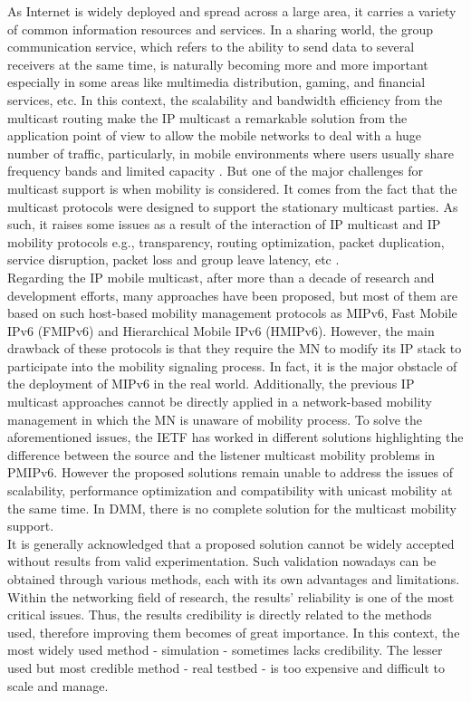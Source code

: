 As Internet is widely deployed and spread across a large area, it carries a variety of common information resources and services. In a sharing world, the group communication service, which refers to the ability to send data to several receivers at the same time, is naturally becoming more and more important especially in some areas like multimedia distribution, gaming, and financial services, etc. In this context, the scalability and bandwidth efficiency from the multicast routing make the IP multicast a remarkable solution from the application point of view to allow the mobile networks to deal with a huge number of traffic, particularly, in mobile environments where users usually share frequency bands and limited capacity \cite{Multicast_MIPv6}. But one of the major challenges for multicast support is when mobility is considered. It comes from the fact that the multicast protocols were designed to support the stationary multicast parties. As such, it raises some issues as a result of the interaction of IP multicast and IP mobility protocols e.g., transparency, routing optimization, packet duplication, service disruption, packet loss and group leave latency, etc \cite{Multicast_MIPv6, multicast_challenges_solutions}.\\
 
Regarding the IP mobile multicast, after more than a decade of research and development efforts, many approaches have been proposed, but most of them are based on such host-based mobility management protocols as MIPv6, Fast Mobile IPv6 (FMIPv6) and Hierarchical Mobile IPv6 (HMIPv6). However, the main drawback of these protocols is that they require the MN to modify its IP stack to participate into the mobility signaling process. In fact, it is the major obstacle of the deployment of MIPv6 in the real world. Additionally, the previous IP multicast approaches cannot be directly applied in a network-based mobility management in which the MN is unaware of mobility process. To solve the aforementioned issues, the IETF has worked in different solutions highlighting the difference between the source and the listener multicast mobility problems in PMIPv6. However the proposed solutions remain unable to address the issues of scalability, performance optimization and compatibility with unicast mobility at the same time. In DMM, there is no complete solution for the multicast mobility support.\\

It is generally acknowledged that a proposed solution cannot be widely accepted without results from valid experimentation. Such validation nowadays can be obtained through various methods, each with its own advantages and limitations. Within the networking field of research, the results’ reliability is one of the most critical issues. Thus, the results credibility is directly related to the methods used, therefore improving them becomes of great importance. In this context, the most widely used method - simulation - sometimes lacks credibility. The lesser used but most credible method - real testbed - is too expensive and difficult to scale and manage. \\

